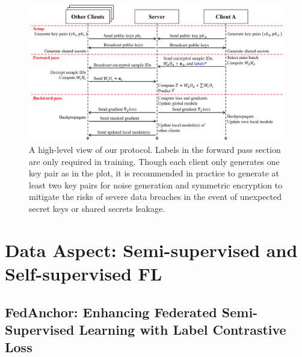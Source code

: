 \documentclass[withindex,glossary,firstyr]{cam-thesis}
\begin{document}

\begin{figure}
\centering

\includegraphics[width=0.9\linewidth]{protocol.png} 
\caption{A high-level view of our protocol.  \color{blue} Labels \color{black} in the forward pass section are only required in training. Though each client only generates one key pair as in the plot, it is recommended in practice to generate at least two key pairs for noise generation and symmetric encryption to mitigate the risks of severe data breaches in the event of unexpected secret keys or shared secrets leakage.}
\label{fig:protocol}
\end{figure}


\section{Data Aspect: Semi-supervised and Self-supervised FL}
\subsection{FedAnchor: Enhancing Federated Semi-Supervised Learning with Label Contrastive Loss}

\end{document}

